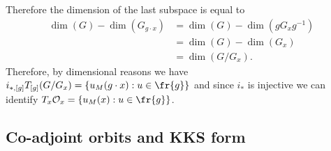 \begin{itemize}
        Therefore the dimension of the last subspace is equal to 
        \begin{equation}
            \begin{split}
                \dim(G)-\dim(G_{g\cdot x})&=\dim(G)-\dim(gG_xg^{-1})\\
                &=\dim(G)-\dim(G_x)\\
                &=\dim(G/G_x).
            \end{split}
        \end{equation}
        Therefore, by dimensional reasons we have $i_{*,[g]}T_{[g]}(G/G_x)=\{u_M(g\cdot x):u\in\fr{g}\}$ and since 
        $i_*$ is injective we can identify $T_x{\mathcal{O}_x}=\{u_M(x):u\in\fr{g}\}$.
\end{itemize}

\subsection{Co-adjoint orbits and KKS form}


